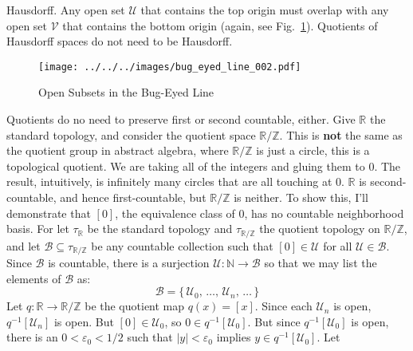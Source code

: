 \documentclass{article}
\theoremstyle{plain}
\theoremstyle{normal}
\begin{document}
        Hausdorff. Any open set $\mathcal{U}$ that contains the top origin must
        overlap with any open set $\mathcal{V}$ that contains the bottom
        origin (again, see Fig.~\ref{fig:bug_eyed_line_002}). Quotients of
        Hausdorff spaces do not need to be Hausdorff.
        \begin{figure}
            \centering
            \texttt{[image: ../../../images/bug\_eyed\_line\_002.pdf]}
            \caption{Open Subsets in the Bug-Eyed Line}
            \label{fig:bug_eyed_line_002}
        \end{figure}
        \par\hfill\par
        Quotients do no need to preserve first or second countable, either.
        Give $\mathbb{R}$ the standard topology, and consider the quotient space
        $\mathbb{R}/\mathbb{Z}$. This is \textbf{not} the same as the quotient
        group in abstract algebra, where $\mathbb{R}/\mathbb{Z}$ is just a
        circle, this is a topological quotient. We are taking all of the
        integers and gluing them to $0$. The result, intuitively, is infinitely
        many circles that are all touching at $0$. $\mathbb{R}$ is
        second-countable, and hence first-countable, but $\mathbb{R}/\mathbb{Z}$
        is neither. To show this, I'll demonstrate that $[0]$, the equivalence
        class of $0$, has no countable neighborhood basis. For let
        $\tau_{\mathbb{R}}$ be the standard topology and
        $\tau_{\mathbb{R}/\mathbb{Z}}$ the quotient topology on
        $\mathbb{R}/\mathbb{Z}$, and let
        $\mathcal{B}\subseteq\tau_{\mathbb{R}/\mathbb{Z}}$ be any countable
        collection such that $[0]\in\mathcal{U}$ for all
        $\mathcal{U}\in\mathcal{B}$. Since $\mathcal{B}$ is countable, there
        is a surjection $\mathcal{U}:\mathbb{N}\rightarrow\mathcal{B}$ so
        that we may list the elements of $\mathcal{B}$ as:
        \begin{equation}
            \mathcal{B}=
            \{\,\mathcal{U}_{0},\,\dots,\,\mathcal{U}_{n},\,\dots\,\}
        \end{equation}
        Let $q:\mathbb{R}\rightarrow\mathbb{R}/\mathbb{Z}$ be the quotient
        map $q(x)=[x]$. Since each $\mathcal{U}_{n}$ is open,
        $q^{-1}[\mathcal{U}_{n}]$ is open. But $[0]\in\mathcal{U}_{0}$, so
        $0\in{q}^{-1}[\mathcal{U}_{0}]$. But since $q^{-1}[\mathcal{U}_{0}]$ is
        open, there is an $0<\varepsilon_{0}<1/2$ such that
        $|y|<\varepsilon_{0}$ implies $y\in{q}^{-1}[\mathcal{U}_{0}]$. Let
\end{document}

